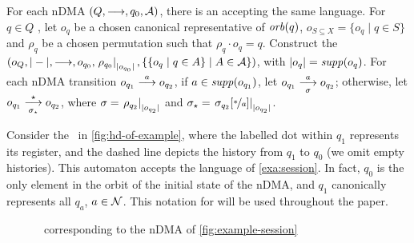 \begin{proposition}\label{prop:ndma-to-hdma}
For each nDMA $(Q,\overset{}{\longrightarrow},q_0,\mathcal{A})$, there is an \hdma{} accepting the same language.
For $q \in Q$ , let $o_q$ be a chosen canonical representative of $\mathit{orb}(q)$, $o_{S \subseteq X} = \{o_q \mid q \in S\}$ and $\rho_q$ be a chosen permutation such that $\rho_q \cdot o_q = q$.	Construct the \hdma\  $(o_Q,|-|,\overset{}{\underset{}{\longrightarrow}},o_{q_0},\left.\rho_{q_0}\right|_{|o_{q_0}|},\{ \{ o_q \mid q \in A\} \mid A \in \mathcal{A} \})$, 
%
with $|o_q| = \mathit{supp}(o_q)$. For each nDMA transition $o_{q_1} \overset{a}{\longrightarrow} o_{q_2}$, if $a \in \mathit{supp}(o_{q_1})$, let $o_{q_1} \overset{a}{\underset{\sigma}{\longrightarrow}} o_{q_2}$; otherwise, let $o_{q_1} \overset{\star}{\underset{\sigma_\star}{\longrightarrow}} o_{q_2}$, where $\sigma=\left.\rho_{q_2}\right|_{|o_{q_2}|}$ and $\sigma_\star = \left.\sigma_{q_2}[\nicefrac{*}{a}]\right|_{|o_{q_2}|}$.
\end{proposition}

\begin{example}
Consider the \hdma\ in \autoref{fig:hd-of-example},
%
where the labelled dot within $q_1$ represents its register, and the dashed line depicts the history from $q_1$ to $q_0$ (we omit empty histories). This automaton accepts the language of \cref{exa:session}. In fact, $q_0$ is the only element in the orbit of the initial state of the nDMA, and $q_1$ canonically represents all $q_a$, $a \in \mathcal{N}$. This notation for \hdmas{} will be used throughout the paper.
\end{example}

\begin{figure}[t]
\caption{\hdma\ corresponding to the nDMA of \autoref{fig:example-session}\label{fig:hd-of-example}}
\end{figure}


% 
